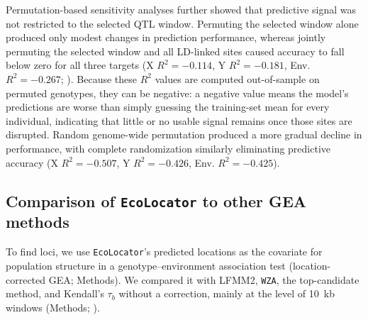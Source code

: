 \documentclass[]{article}
\newcommand{\ecolocator}{\texttt{EcoLocator}\xspace}
\begin{document}
Permutation-based sensitivity analyses further showed that predictive signal was 
not restricted to the selected QTL window. Permuting the selected window alone 
produced only modest changes in prediction performance, whereas jointly permuting 
the selected window and all LD-linked sites caused accuracy to fall below zero for 
all three targets (X $R^2=-0.114$, Y $R^2=-0.181$, Env. $R^2=-0.267$;
). Because these $R^2$ values are computed out-of-sample on
permuted genotypes, they can be negative: a negative value means the
model's predictions are worse than simply guessing the training-set mean for every
individual, indicating that little or no usable signal remains once those sites are
disrupted. Random genome-wide permutation produced a more
gradual decline in performance, with complete randomization similarly 
eliminating predictive accuracy (X $R^2=-0.507$, Y $R^2=-0.426$, Env. $R^2=-0.425$).


\subsection{Comparison of \ecolocator to other GEA methods}

To find loci, we use \ecolocator's predicted locations
as the covariate for population structure
in a genotype--environment association test
(location-corrected GEA; Methods).
We compared it with LFMM2, \texttt{WZA}, the top-candidate method,
and Kendall's $\tau_b$ without a correction,
mainly at the level of 10~kb windows (Methods; ).
\end{document}
